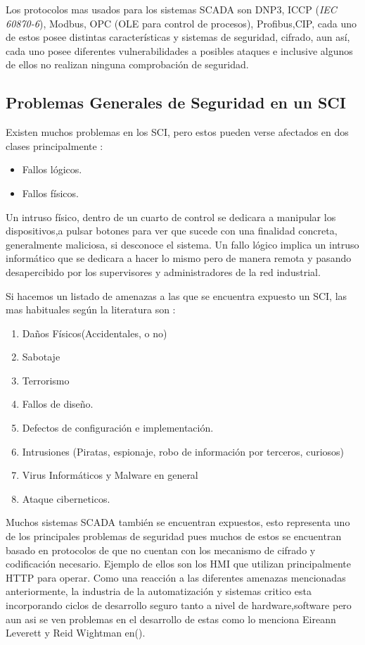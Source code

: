 \documentclass[jou]{apa6}   %
\begin{document}
Los protocolos mas usados para los sistemas SCADA son DNP3, ICCP (\textit{IEC 60870-6}), Modbus, OPC (OLE para control de procesos), Profibus,CIP, cada uno de estos posee distintas características y sistemas de seguridad, cifrado, aun así, cada uno posee diferentes vulnerabilidades a posibles ataques e inclusive algunos de ellos no realizan ninguna comprobación de seguridad.

\subsection{Problemas Generales de Seguridad en un SCI }
Existen muchos problemas en los SCI, pero estos pueden verse afectados en dos clases principalmente :
\begin{itemize}  
\item Fallos lógicos.
\item Fallos físicos.
\end{itemize}
Un intruso físico, dentro de un cuarto de control se dedicara a manipular los dispositivos,a pulsar botones para ver que sucede con una finalidad concreta, generalmente maliciosa, si desconoce el sistema. Un fallo lógico implica un intruso informático que se dedicara a hacer lo mismo pero de manera remota y pasando desapercibido por los supervisores y administradores de la red industrial.

Si hacemos un listado de amenazas a las que se encuentra expuesto un SCI, las mas habituales según la literatura son :
\begin{enumerate}
\item Daños Físicos(Accidentales, o no)
\item Sabotaje
\item Terrorismo
\item Fallos de diseño.
\item Defectos de configuración e implementación.
\item Intrusiones (Piratas, espionaje, robo de información por terceros, curiosos)
\item Virus Informáticos y Malware en general
\item Ataque ciberneticos.
\end{enumerate}
Muchos sistemas SCADA también se encuentran expuestos, esto representa uno de los principales problemas de seguridad pues muchos de estos se encuentran basado en protocolos de que no cuentan con los mecanismo de cifrado y codificación necesario. Ejemplo de ellos son los HMI que utilizan principalmente HTTP para operar. Como una reacción a las diferentes amenazas mencionadas anteriormente, la industria de la automatización y sistemas critico esta incorporando ciclos de desarrollo seguro tanto a nivel de hardware,software pero aun asi se ven problemas en el desarrollo de estas como lo menciona Eireann Leverett y Reid Wightman en(\cite{Eireann}).
\end{document}
